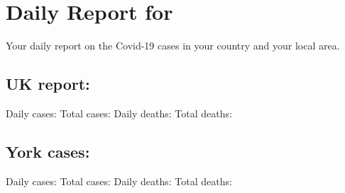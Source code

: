 \documentclass{article}
\begin{document}
\section*{Daily Report for \@date}
Your daily report on the Covid-19 cases in your country and your local area.
\subsection*{UK report:}
Daily cases: 
Total cases: 
Daily deaths: 
Total deaths: 

\subsection*{York cases:}
Daily cases: 
Total cases: 
Daily deaths: 
Total deaths: 
\end{document}
